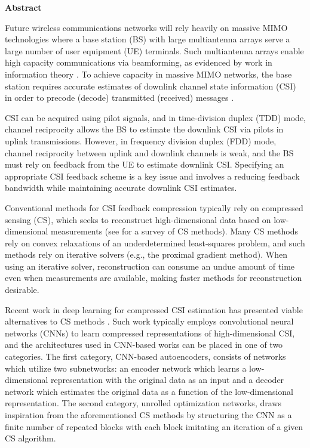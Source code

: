 \newpage
{\baselineskip 14pt   } \vspace{27pt}
\centerline{\Huge \bf {Abstract}} \vspace{18pt}

Future wireless communications networks will rely heavily on massive MIMO technologies where a base station (BS) with large multiantenna arrays serve a large number of user equipment (UE) terminals. Such multiantenna arrays enable high capacity communications via beamforming, as evidenced by work in information theory \cite{ref:goldsmith2003capacity}. To achieve capacity in massive MIMO networks, the base station requires accurate estimates of downlink channel state information (CSI) in order to precode (decode) transmitted (received) messages \cite{ref:marzetta2016fundamentals}.

CSI can be acquired using pilot signals, and in time-division duplex (TDD) mode, channel reciprocity allows the BS to estimate the downlink CSI via pilots in uplink transmissions. However, in frequency division duplex (FDD) mode, channel reciprocity between uplink and downlink channels is weak, and the BS must rely on feedback from the UE to estimate downlink CSI. Specifying an appropriate CSI feedback scheme is a key issue and involves a reducing feedback bandwidth while maintaining accurate downlink CSI estimates.

Conventional methods for CSI feedback compression typically rely on compressed sensing (CS), which seeks to reconstruct high-dimensional data based on low-dimensional measurements (see \cite{ref:Marques2019ReviewOfSparseRecovery} for a survey of CS methods). Many CS methods rely on convex relaxations of an underdetermined least-squares problem, and such methods rely on iterative solvers (e.g., the proximal gradient method). When using an iterative solver, reconstruction can consume an undue amount of time even when measurements are available, making faster methods for reconstruction desirable.

Recent work in deep learning for compressed CSI estimation has presented viable alternatives to CS methods \cite{ref:csinet}. Such work typically employs convolutional neural networks (CNNs) to learn compressed representations of high-dimensional CSI, and the architectures used in CNN-based works can be placed in one of two categories. The first category, CNN-based autoencoders, consists of networks which utilize two subnetworks: an encoder network which learns a low-dimensional representation with the original data as an input and a decoder network which estimates the original data as a function of the low-dimensional representation. The second category, unrolled optimization networks, draws inspiration from the aforementioned CS methods by structuring the CNN as a finite number of repeated blocks with each block imitating an iteration of a given CS algorithm.

